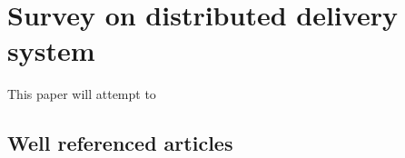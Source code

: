 \section{Survey on distributed delivery system}

This paper will attempt to 

\subsection{Well referenced articles}
\cite{Lawrence99digitallibraries}
\cite{Reynolds_efficientpeer-to-peer}
\cite{Yang02improvingsearch}
\cite{Rhea:2005:OPD:1090191.1080102}
\cite{Huebsch:2003:QIP:1315451.1315480}
\cite{Cohen03incentivesbuild}
